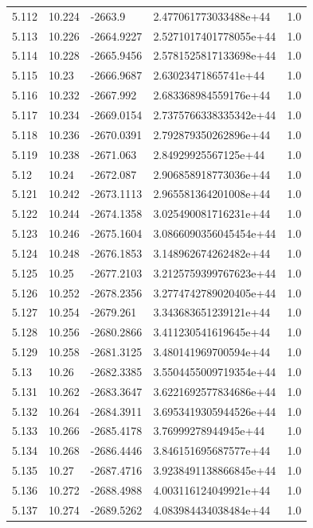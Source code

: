 \begin{tabular}{lllll}
5.112 & 10.224 & -2663.9 & 2.477061773033488e+44 & 1.0 \\
5.113 & 10.226 & -2664.9227 & 2.5271017401778055e+44 & 1.0 \\
5.114 & 10.228 & -2665.9456 & 2.5781525817133698e+44 & 1.0 \\
5.115 & 10.23 & -2666.9687 & 2.63023471865741e+44 & 1.0 \\
5.116 & 10.232 & -2667.992 & 2.683368984559176e+44 & 1.0 \\
5.117 & 10.234 & -2669.0154 & 2.7375766338335342e+44 & 1.0 \\
5.118 & 10.236 & -2670.0391 & 2.792879350262896e+44 & 1.0 \\
5.119 & 10.238 & -2671.063 & 2.84929925567125e+44 & 1.0 \\
5.12 & 10.24 & -2672.087 & 2.906858918773036e+44 & 1.0 \\
5.121 & 10.242 & -2673.1113 & 2.965581364201008e+44 & 1.0 \\
5.122 & 10.244 & -2674.1358 & 3.025490081716231e+44 & 1.0 \\
5.123 & 10.246 & -2675.1604 & 3.0866090356045454e+44 & 1.0 \\
5.124 & 10.248 & -2676.1853 & 3.148962674262482e+44 & 1.0 \\
5.125 & 10.25 & -2677.2103 & 3.2125759399767623e+44 & 1.0 \\
5.126 & 10.252 & -2678.2356 & 3.2774742789020405e+44 & 1.0 \\
5.127 & 10.254 & -2679.261 & 3.343683651239121e+44 & 1.0 \\
5.128 & 10.256 & -2680.2866 & 3.411230541619645e+44 & 1.0 \\
5.129 & 10.258 & -2681.3125 & 3.480141969700594e+44 & 1.0 \\
5.13 & 10.26 & -2682.3385 & 3.5504455009719354e+44 & 1.0 \\
5.131 & 10.262 & -2683.3647 & 3.6221692577834686e+44 & 1.0 \\
5.132 & 10.264 & -2684.3911 & 3.6953419305944526e+44 & 1.0 \\
5.133 & 10.266 & -2685.4178 & 3.76999278944945e+44 & 1.0 \\
5.134 & 10.268 & -2686.4446 & 3.846151695687577e+44 & 1.0 \\
5.135 & 10.27 & -2687.4716 & 3.9238491138866845e+44 & 1.0 \\
5.136 & 10.272 & -2688.4988 & 4.003116124049921e+44 & 1.0 \\
5.137 & 10.274 & -2689.5262 & 4.083984434038484e+44 & 1.0 \\

\end{tabular}
